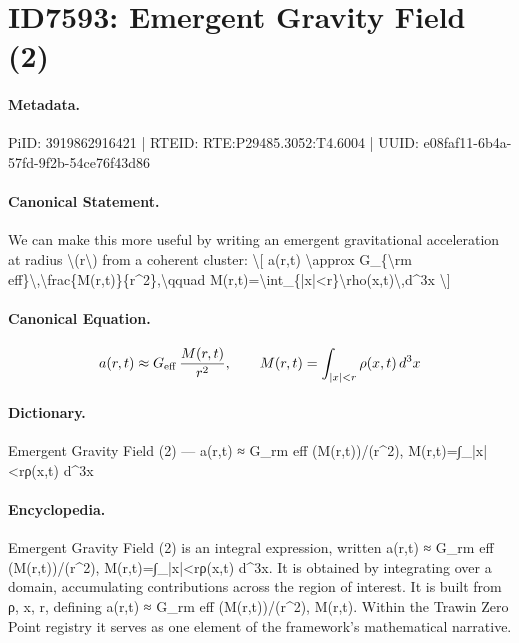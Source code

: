 \section*{ID7593: Emergent Gravity Field (2)}
\paragraph{Metadata.}
PiID: 3919862916421 | RTEID: RTE:P29485.3052:T4.6004 | UUID: e08faf11-6b4a-57fd-9f2b-54ce76f43d86

\paragraph{Canonical Statement.}
We can make this more useful by writing an emergent gravitational acceleration at radius \textbackslash{}(r\textbackslash{}) from a coherent cluster: \textbackslash{}[ a(r,t) \textbackslash{}approx G\_\{\textbackslash{}rm eff\}\textbackslash{},\textbackslash{}frac\{M(r,t)\}\{r\textasciicircum{}2\},\textbackslash{}qquad M(r,t)=\textbackslash{}int\_\{|x|<r\}\textbackslash{}rho(x,t)\textbackslash{},d\textasciicircum{}3x \textbackslash{}]

\paragraph{Canonical Equation.}
\[
a(r,t) \approx G_{\rm eff}\,\frac{M(r,t)}{r^2},\qquad M(r,t)=\int_{|x|<r}\rho(x,t)\,d^3x
\]

\paragraph{Dictionary.}
Emergent Gravity Field (2) — a(r,t) ≈ G\_rm eff (M(r,t))/(r\textasciicircum{}2), M(r,t)=∫\_|x|<rρ(x,t) d\textasciicircum{}3x

\paragraph{Encyclopedia.}
Emergent Gravity Field (2) is an integral expression, written a(r,t) ≈ G\_rm eff (M(r,t))/(r\textasciicircum{}2), M(r,t)=∫\_|x|<rρ(x,t) d\textasciicircum{}3x. It is obtained by integrating over a domain, accumulating contributions across the region of interest. It is built from ρ, x, r, defining a(r,t) ≈ G\_rm eff (M(r,t))/(r\textasciicircum{}2), M(r,t). Within the Trawin Zero Point registry it serves as one element of the framework's mathematical narrative.

